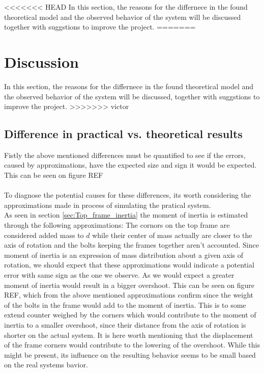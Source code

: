 \documentclass[../../main]{subfiles}
\begin{document}
<<<<<<< HEAD
In this section, the reasons for the differnece in the found theoretical model and the observed behavior of the system will be discussed together with suggstions to improve the project.
=======
\section{Discussion}
\label{sec:discussion}
In this section, the reasons for the differnece in the found theoretical model and the observed behavior of the system will be discussed, together with suggstions to improve the project.
>>>>>>> victor
\subsection{Difference in practical vs. theoretical results}
Fistly the above mentioned differences must be quantified to see if the errors, caused by approximations, have the expected size and sign it would be expected. This can be seen on figure REF\\
\\
To diagnose the potential causes for these differences, its worth considering the approximations made in process of simulating the pratical system.\\
As seen in section \ref{sec:Top_frame_inertia} the moment of inertia is estimated through the following approximations: The cornors on the top frame are considered added mass to $d$ while their center of mass actually are closer to the axis of rotation and the bolts keeping the frames together aren't accounted. Since moment of inertia is an expression of mass distribution about a given axis of rotation, we should expect that these approximations would indicate a potential error with same sign as the one we observe. As we would expect a greater moment of inertia would result in a bigger overshoot. This can be seen on figure REF, which from the above mentioned approximations confirm since the weight of the bolts in the frame would add to the moment of inertia. This is to some extend counter weighed by the corners which would contribute to the moment of inertia to a smaller overshoot, since their distance from the axis of rotation is shorter on the actual system. It is here worth mentioning that the displacement of the frame corners would contribute to the lowering of the overshoot. While this might be present, its influence on the resulting behavior seems to be small based on the real systems bavior.\\
\end{document}
